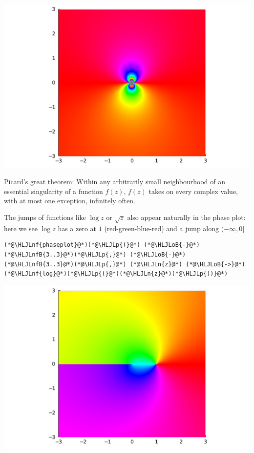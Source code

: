 \documentclass[12pt,a4paper]{article}
\newcommand{\HLJLn}[1]{#1}
\newcommand{\HLJLnf}[1]{\textcolor[RGB]{66,102,213}{#1}}
\newcommand{\HLJLnfB}[1]{\textcolor[RGB]{59,151,46}{#1}}
\newcommand{\HLJLoB}[1]{\textcolor[RGB]{102,102,102}{\textbf{#1}}}
\newcommand{\HLJLp}[1]{#1}
\begin{document}
\includegraphics[width=\linewidth]{figures/Lecture1_11_1.pdf}

Picard's great theorem: Within any arbitrarily small neighbourhood of an essential singularity of a function $f(z)$, $f(z)$ takes on every complex value, with at most one exception, infinitely often.

The jumps of functions like $\log z$ or $\sqrt z$ also appear naturally in the phase plot: here we see $\log z$ has a zero at $1$ (red-green-blue-red) and a jump along $(-\infty,0]$


\begin{lstlisting}
(*@\HLJLnf{phaseplot}@*)(*@\HLJLp{(}@*) (*@\HLJLoB{-}@*)(*@\HLJLnfB{3..3}@*)(*@\HLJLp{,}@*) (*@\HLJLoB{-}@*)(*@\HLJLnfB{3..3}@*)(*@\HLJLp{,}@*) (*@\HLJLn{z}@*) (*@\HLJLoB{->}@*) (*@\HLJLnf{log}@*)(*@\HLJLp{(}@*)(*@\HLJLn{z}@*)(*@\HLJLp{))}@*)
\end{lstlisting}

\includegraphics[width=\linewidth]{figures/Lecture1_12_1.pdf}
\end{document}
